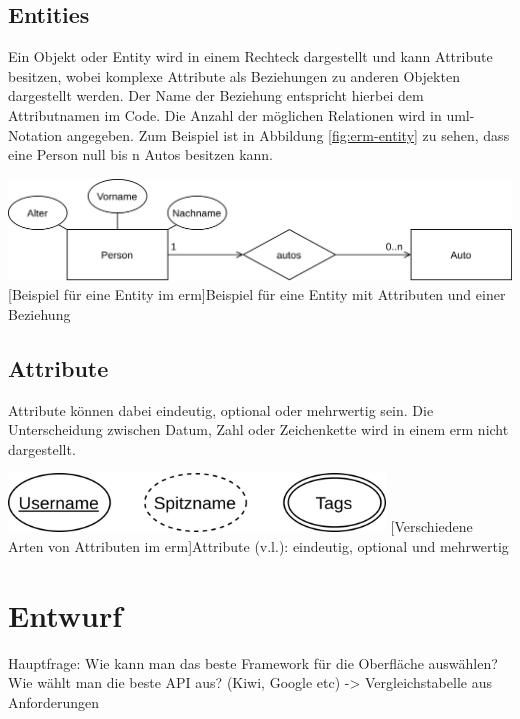 \documentclass[12pt,twoside,a4paper]{article}
\begin{document}
\subsection*{Entities}
Ein Objekt oder Entity wird in einem Rechteck dargestellt und kann Attribute besitzen, wobei komplexe Attribute als Beziehungen zu anderen Objekten dargestellt werden. Der Name der Beziehung entspricht hierbei dem Attributnamen im Code. Die Anzahl der möglichen Relationen wird in \acrshort{uml}-Notation angegeben. Zum Beispiel ist in Abbildung \ref{fig:erm-entity} zu sehen, dass eine Person null bis n Autos besitzen kann.
\begin{center}
	\captionsetup{type=figure}
	\includegraphics[width=\textwidth]{images/ERM-Entity}
	[Beispiel für eine Entity im \acrshort{erm}]{Beispiel für eine Entity mit Attributen und einer Beziehung}
	\label{fig:erm-entity}
\end{center}
\subsection*{Attribute}
Attribute können dabei eindeutig, optional oder mehrwertig sein. Die Unterscheidung zwischen Datum, Zahl oder Zeichenkette wird in einem \acrlong{erm} nicht dargestellt.
\begin{center}
	\captionsetup{type=figure}
	\includegraphics[width=10cm]{images/ERM-Attributes}
	[Verschiedene Arten von Attributen im \acrshort{erm}]{Attribute (v.l.): eindeutig, optional und mehrwertig}
	\label{fig:erm-attributes}
\end{center}
\section{Entwurf}
Hauptfrage:
Wie kann man das beste Framework für die Oberfläche auswählen?
Wie wählt man die beste API aus? (Kiwi, Google etc) -> Vergleichstabelle aus Anforderungen
\end{document}
